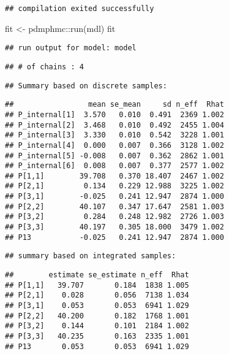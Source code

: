 \documentclass[
]{book}
\newenvironment{Shaded}{\begin{snugshade}}{\end{snugshade}}
\newcommand{\FunctionTok}[1]{\textcolor[rgb]{0.00,0.00,0.00}{#1}}
\newcommand{\NormalTok}[1]{#1}
\newcommand{\OtherTok}[1]{\textcolor[rgb]{0.56,0.35,0.01}{#1}}
\newcommand{\SpecialCharTok}[1]{\textcolor[rgb]{0.00,0.00,0.00}{#1}}
\begin{document}
\begin{verbatim}
## compilation exited successfully
\end{verbatim}

\begin{Shaded}
\begin{Highlighting}[]
\NormalTok{fit }\OtherTok{\textless{}{-}}\NormalTok{ pdmphmc}\SpecialCharTok{::}\FunctionTok{run}\NormalTok{(mdl)}
\NormalTok{fit}
\end{Highlighting}
\end{Shaded}

\begin{verbatim}
## run output for model: model
\end{verbatim}

\begin{verbatim}
## # of chains : 4
\end{verbatim}

\begin{verbatim}
## Summary based on discrete samples:
\end{verbatim}

\begin{verbatim}
##                 mean se_mean     sd n_eff  Rhat
## P_internal[1]  3.570   0.010  0.491  2369 1.002
## P_internal[2]  3.468   0.010  0.492  2455 1.004
## P_internal[3]  3.330   0.010  0.542  3228 1.001
## P_internal[4]  0.000   0.007  0.366  3128 1.002
## P_internal[5] -0.008   0.007  0.362  2862 1.001
## P_internal[6]  0.008   0.007  0.377  2577 1.002
## P[1,1]        39.708   0.370 18.407  2467 1.002
## P[2,1]         0.134   0.229 12.988  3225 1.002
## P[3,1]        -0.025   0.241 12.947  2874 1.000
## P[2,2]        40.107   0.347 17.647  2581 1.003
## P[3,2]         0.284   0.248 12.982  2726 1.003
## P[3,3]        40.197   0.305 18.000  3479 1.002
## P13           -0.025   0.241 12.947  2874 1.000
\end{verbatim}

\begin{verbatim}
## summary based on integrated samples:
\end{verbatim}

\begin{verbatim}
##        estimate se_estimate n_eff  Rhat
## P[1,1]   39.707       0.184  1838 1.005
## P[2,1]    0.028       0.056  7138 1.034
## P[3,1]    0.053       0.053  6941 1.029
## P[2,2]   40.200       0.182  1768 1.001
## P[3,2]    0.144       0.101  2184 1.002
## P[3,3]   40.235       0.163  2335 1.001
## P13       0.053       0.053  6941 1.029
\end{verbatim}
\end{document}
